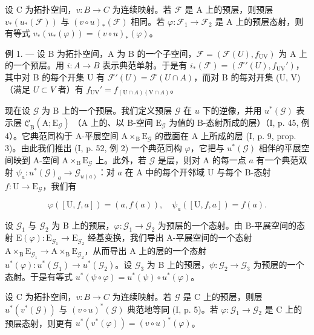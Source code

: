 设 C 为拓扑空间，\(v: B \to C\) 为连续映射。若 \(\mathcal{F}\) 是 A 上的预层，则预层 \(v_{*}(u_{*}(\mathcal{F}))\) 与 \((v \circ u)_{*}(\mathcal{F})\) 相同。若 \(\varphi: \mathcal{F}_{1} \to \mathcal{F}_{2}\) 是 A 上的预层态射，则有等式 \(v_{*}(u_{*}(\varphi)) = (v \circ u)_{*}(\varphi)\)。

例 1. --- 设 B 为拓扑空间，A 为 B 的一个子空间，\(\mathcal{F} = (\mathcal{F}(U), f_{\mathrm{UV}})\) 为 A 上的一个预层。用 \(i: A \to B\) 表示典范单射。于是有 \(i_*(\mathcal{F}) = (\mathcal{F}'(U), f_{\mathrm{UV}}')\)，其中对 B 的每个开集 U 有 \(\mathcal{F}'(U) = \mathcal{F}(U \cap A)\)，而对 B 的每对开集 (U, V) （满足 \(U \subset V\) 者）有 \(f_{\mathrm{UV}}' = f_{(\mathrm{U} \cap A)(\mathrm{V} \cap A)}\)。

现在设 \(\mathcal{G}\) 为 B 上的一个预层。我们定义预层 \(\mathcal{G}\) 在 \(u\) 下的逆像，并用 \(u^{*}(\mathcal{G})\) 表示层 \(\underline{\mathcal{C}}_{\mathrm{B}}(\mathrm{A};\mathrm{E}_{\mathcal{G}})\) （A 上的、以 B-空间 \(\mathrm{E}_{\mathcal{G}}\) 为值的 B-态射所成的层）（I, p. 45, 例 4）。它典范同构于 A-平展空间 \(\mathrm{A} \times_{\mathrm{B}} \mathrm{E}_{\mathcal{G}}\) 的截面在 A 上所成的层 (I, p. 9, prop. 3)。由此我们推出 (I, p. 52, 例 2) 一个典范同构 \(\varphi\)，它把与 \(u^{*}(\mathcal{G})\) 相伴的平展空间映到 A-空间 \(\mathrm{A} \times_{\mathrm{B}} \mathrm{E}_{\mathcal{G}}\) 上。此外，若 \(\mathcal{G}\) 是层，则对 A 的每一点 \(a\) 有一个典范双射 \(\psi_{a}: u^{*}(\mathcal{G})_{a} \to \mathcal{G}_{u(a)}\)：对 \(a\) 在 A 中的每个开邻域 U 与每个 B-态射 \(f: \mathrm{U} \to \mathrm{E}_{\mathcal{G}}\)，我们有

\[
\varphi ([ \mathrm{U}, f, a ]) = (a, f (a)), \quad \psi_ {a} ([ \mathrm{U}, f, a ]) = f (a).
\]

设 \(\mathcal{G}_1\) 与 \(\mathcal{G}_2\) 为 B 上的预层，\(\varphi\colon\mathcal{G}_1\to\mathcal{G}_2\) 为预层的一个态射。由 B-平展空间的态射 \(\mathrm{E}(\varphi)\colon\mathrm{E}_{\mathcal{G}_1}\to\mathrm{E}_{\mathcal{G}_2}\) 经基变换，我们导出 A-平展空间的一个态射 \(\mathrm{A}\times_{\mathrm{B}}\mathrm{E}_{\mathcal{G}_1}\to\mathrm{A}\times_{\mathrm{B}}\mathrm{E}_{\mathcal{G}_2}\)，从而导出 A 上的层的一个态射 \(u^{*}(\varphi)\colon u^{*}(\mathcal{G}_{1})\to u^{*}(\mathcal{G}_{2})\)。设 \(\mathcal{G}_3\) 为 B 上的预层，\(\psi\colon\mathcal{G}_2\to\mathcal{G}_3\) 为预层的一个态射。于是有等式 \(u^{*}(\psi\circ\varphi)=u^{*}(\psi)\circ u^{*}(\varphi)\)。

设 C 为拓扑空间，\(v\colon B \to C\) 为连续映射。若 \(\mathcal{G}\) 是 C 上的预层，则层 \(u^{*}(v^{*}(\mathcal{G}))\) 与 \((v \circ u)^{*}(\mathcal{G})\) 典范地等同 (I, p. 5)。若 \(\varphi\colon\mathcal{G}_{1} \to \mathcal{G}_{2}\) 是 C 上的预层态射，则更有 \(u^{*}(v^{*}(\varphi)) = (v \circ u)^{*}(\varphi)\)。

